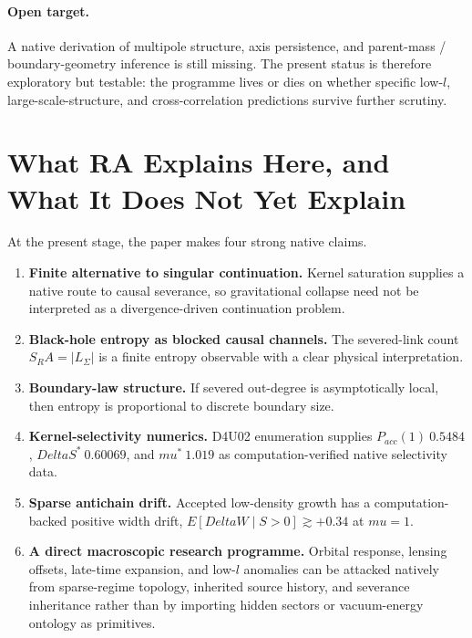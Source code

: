 \documentclass[11pt]{article}
\def\ell{l}%
\def\Delta{Delta}%
\def\mu{mu}%
\def\mathrm#1{#1}%
\def\mathbb#1{#1}%
\def\approx{~}%
\def\SRa{S_RA}%
\newcommand{\SRa}{\ensuremath{S_{\mathrm{RA}}}}
\begin{document}
\paragraph{Open target.} A native derivation of multipole structure, axis persistence, and parent-mass / boundary-geometry inference is still missing. The present status is therefore exploratory but testable: the programme lives or dies on whether specific low-$\ell$, large-scale-structure, and cross-correlation predictions survive further scrutiny.

\section{What RA Explains Here, and What It Does Not Yet Explain}

At the present stage, the paper makes four strong native claims.
\begin{enumerate}[nosep]
    \item \textbf{Finite alternative to singular continuation.} Kernel saturation supplies a native route to causal severance, so gravitational collapse need not be interpreted as a divergence-driven continuation problem.
    \item \textbf{Black-hole entropy as blocked causal channels.} The severed-link count $\SRa=|L_\Sigma|$ is a finite entropy observable with a clear physical interpretation.
    \item \textbf{Boundary-law structure.} If severed out-degree is asymptotically local, then entropy is proportional to discrete boundary size.
    \item \textbf{Kernel-selectivity numerics.} D4U02 enumeration supplies $P_{\mathrm{acc}}(1)\approx0.5484$, $\Delta S^*\approx0.60069$, and $\mu^*\approx1.019$ as computation-verified native selectivity data.
    \item \textbf{Sparse antichain drift.} Accepted low-density growth has a computation-backed positive width drift, $\mathbb{E}[\Delta W\mid S>0]\gtrsim+0.34$ at $\mu=1$.
    \item \textbf{A direct macroscopic research programme.} Orbital response, lensing offsets, late-time expansion, and low-$\ell$ anomalies can be attacked natively from sparse-regime topology, inherited source history, and severance inheritance rather than by importing hidden sectors or vacuum-energy ontology as primitives.
\end{enumerate}
\end{document}

